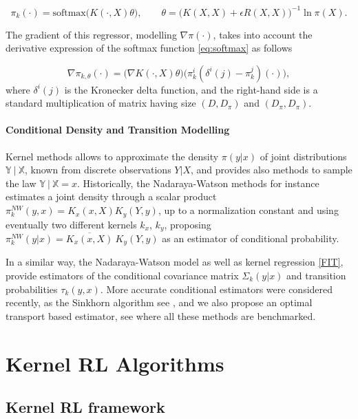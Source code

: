 \documentclass[
]{article}
\numberwithin{equation}{section}
\begin{document}
\begin{equation} \label{pi_k}
 \pi_{k}(\cdot) = \text{softmax}\Big( K(\cdot,X) \theta \Big), \qquad \theta =\big( K(X,X) + \epsilon R(X,X) \big)^{-1} \ln \pi(X).
\end{equation} 

The gradient of this regressor, modelling $\nabla \pi(\cdot)$,  takes into account the derivative expression of the softmax function \eqref{eq:softmax} as follows

\begin{equation}
 \nabla \pi_{k, \theta}(\cdot) = \Big( \nabla K (\cdot,X) \theta \Big)\Big( \pi^i_k(\delta^i(j)-\pi^j_k)(\cdot)\Big),
\end{equation} 
where
$\delta^i(j)$ is the Kronecker delta function, and the right-hand side is a standard multiplication of matrix having size $(D,D_\pi)$ and $(D_\pi,D_\pi)$.

\paragraph*{Conditional Density and Transition Modelling} Kernel methods allows to approximate the density $\pi( y | x)$ of joint distributions $\mathbb{Y} \ | \ \mathbb{X}$, known from discrete observations $Y | X$, and provides also methods to sample the law $\mathbb{Y} \ | \ \mathbb{X} = x$. Historically, the  Nadaraya-Watson methods for instance estimates a joint density through a scalar product $\pi^{NW}_k(y,x) = K_x(x,X)K_y(Y,y)$, up to a normalization constant and using eventually two different kernels $k_x$, $k_y$, proposing $\pi_k^{NW}( y | x) = \overline{K_x(x,X)} \ {K_y(Y,y)} $ as an estimator of conditional probability. 

In a similar way, the Nadaraya-Watson model as well as kernel regression \eqref{FIT}, provide estimators of the conditional covariance matrix $\Sigma_k(y|x)$ and transition probabilities $\tau_k(y,x)$. More accurate conditional estimators were considered recently, as the Sinkhorn algorithm see \cite{Cuturi:2013}, and we also propose an optimal transport based estimator, see \cite{LeMeMi:2024} where all these methods are benchmarked.  


\hypertarget{Kernel RL Algorithms}{%
\section{Kernel RL Algorithms}\label{Kernel RL Algorithms}}

\hypertarget{Kernel RL framework}{%
\subsection{Kernel RL framework}\label{Kernel RL framework}}
\end{document}
